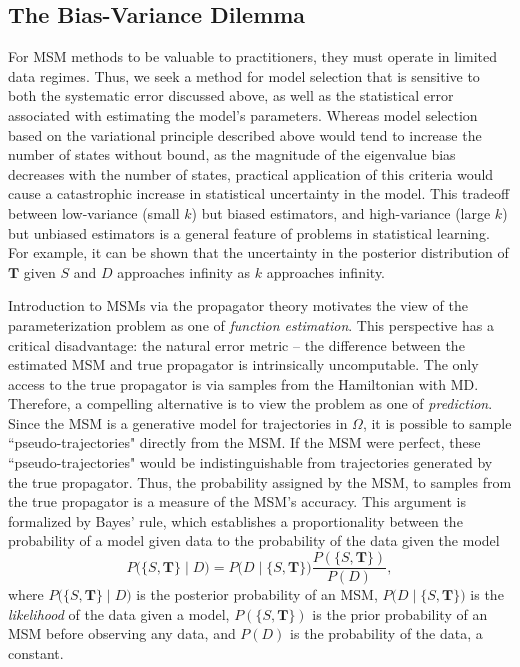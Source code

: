 \documentclass[journal=jpcbfk, layout=traditional, manuscript=article]{achemso}
\begin{document}
\subsection{The Bias-Variance Dilemma}
For MSM methods to be valuable to practitioners, they must operate in limited data regimes. Thus, we seek a method for model selection that is sensitive to both the systematic error discussed above, as well as the statistical error associated with estimating the model's parameters. Whereas model selection based on the variational principle described above would tend to increase the number of states without bound, as the magnitude of the eigenvalue bias decreases with the number of states, practical application of this criteria would cause a catastrophic increase in statistical uncertainty in the model. This tradeoff between low-variance (small $k$) but biased estimators, and high-variance (large $k$) but unbiased estimators is a general feature of problems in statistical learning\cite{Sammut2010Encyclopedia}. For example, it can be shown that the uncertainty in the posterior distribution of $\mathbf{T}$ given $S$ and $D$ approaches infinity as $k$ approaches infinity.

Introduction to MSMs via the propagator theory motivates the view of the parameterization problem as one of \emph{function estimation}. This perspective has a critical disadvantage: the natural error metric -- the difference between the estimated MSM and true propagator is intrinsically uncomputable. The only access to the true propagator is via samples from the Hamiltonian with MD. Therefore, a compelling alternative is to view the problem as one of \emph{prediction}. Since the MSM is a generative model for trajectories in $\Omega$, it is possible to sample ``pseudo-trajectories" directly from the MSM. If the MSM were perfect, these ``pseudo-trajectories" would be indistinguishable from trajectories generated by the true propagator. Thus, the probability assigned by the MSM, to samples from the true propagator is a measure of the MSM's accuracy. This argument is formalized by Bayes' rule, which establishes a proportionality between the probability of a model given data to the probability of the data given the model
\begin{equation}
\label{eq:bayes}
P\Big(\{S, \mathbf{T}\} \;\Big|\; D\Big) = P\Big(D \;\Big|\; \{S, \mathbf{T}\}\Big) \frac{P(\{S, \mathbf{T}\})}{P(D)},
\end{equation}
where $P\Big(\{S, \mathbf{T}\} \;\Big|\; D\Big)$ is the posterior probability of an MSM, $P\Big(D \;\Big|\; \{S, \mathbf{T}\}\Big)$ is the \emph{likelihood} of the data given a model, $P(\{S, \mathbf{T}\})$ is the prior probability of an MSM before observing any data, and $P(D)$ is the probability of the data, a constant.
\end{document}
